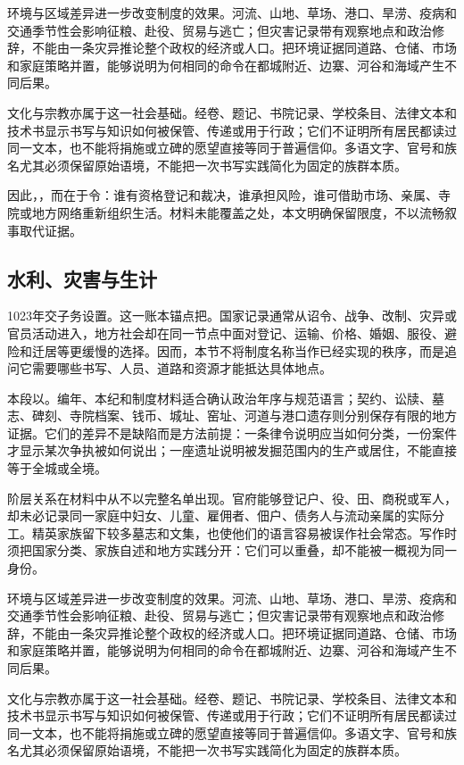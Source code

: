 环境与区域差异进一步改变制度的效果。河流、山地、草场、港口、旱涝、疫病和交通季节性会影响征粮、赴役、贸易与逃亡；但灾害记录带有观察地点和政治修辞，不能由一条灾异推论整个政权的经济或人口。把环境证据同道路、仓储、市场和家庭策略并置，能够说明为何相同的命令在都城附近、边寨、河谷和海域产生不同后果。

文化与宗教亦属于这一社会基础。经卷、题记、书院记录、学校条目、法律文本和技术书显示书写与知识如何被保管、传递或用于行政；它们不证明所有居民都读过同一文本，也不能将捐施或立碑的愿望直接等同于普遍信仰。多语文字、官号和族名尤其必须保留原始语境，不能把一次书写实践简化为固定的族群本质。

因此，，而在于令：谁有资格登记和裁决，谁承担风险，谁可借助市场、亲属、寺院或地方网络重新组织生活。材料未能覆盖之处，本文明确保留限度，不以流畅叙事取代证据。

\subsection{水利、灾害与生计}

1023年交子务设置。这一账本锚点把。国家记录通常从诏令、战争、改制、灾异或官员活动进入，地方社会却在同一节点中面对登记、运输、价格、婚姻、服役、避险和迁居等更缓慢的选择。因而，本节不将制度名称当作已经实现的秩序，而是追问它需要哪些书写、人员、道路和资源才能抵达具体地点。

本段以。编年、本纪和制度材料适合确认政治年序与规范语言；契约、讼牍、墓志、碑刻、寺院档案、钱币、城址、窑址、河道与港口遗存则分别保存有限的地方证据。它们的差异不是缺陷而是方法前提：一条律令说明应当如何分类，一份案件才显示某次争执被如何说出；一座遗址说明被发掘范围内的生产或居住，不能直接等于全城或全境。

阶层关系在材料中从不以完整名单出现。官府能够登记户、役、田、商税或军人，却未必记录同一家庭中妇女、儿童、雇佣者、佃户、债务人与流动亲属的实际分工。精英家族留下较多墓志和文集，也使他们的语言容易被误作社会常态。写作时须把国家分类、家族自述和地方实践分开：它们可以重叠，却不能被一概视为同一身份。

环境与区域差异进一步改变制度的效果。河流、山地、草场、港口、旱涝、疫病和交通季节性会影响征粮、赴役、贸易与逃亡；但灾害记录带有观察地点和政治修辞，不能由一条灾异推论整个政权的经济或人口。把环境证据同道路、仓储、市场和家庭策略并置，能够说明为何相同的命令在都城附近、边寨、河谷和海域产生不同后果。

文化与宗教亦属于这一社会基础。经卷、题记、书院记录、学校条目、法律文本和技术书显示书写与知识如何被保管、传递或用于行政；它们不证明所有居民都读过同一文本，也不能将捐施或立碑的愿望直接等同于普遍信仰。多语文字、官号和族名尤其必须保留原始语境，不能把一次书写实践简化为固定的族群本质。

